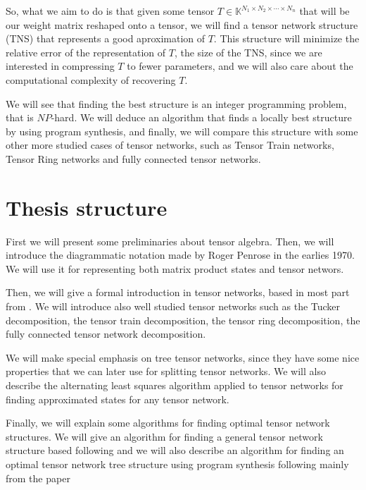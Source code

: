 \documentclass[11pt,a4paper,openright,oneside]{book}
\numberwithin{equation}{section}
\begin{document}
So, what we aim to do is that given some tensor $T \in \mathbb{K}^{N_1 \times N_2 \times \cdots \times N_n}$ that
will be our weight matrix reshaped onto a tensor, we will find a tensor network structure (TNS) that
represents a good aproximation of $T$. This structure will minimize the relative error of the representation of $T$,
the size of the TNS, since we are
interested in compressing $T$ to fewer parameters, and we will also care about the computational complexity of recovering
$T$.

We will see that finding the best structure is an integer programming problem, that is $NP$-hard. We will deduce
an algorithm that finds a locally best structure by using program synthesis, and finally, we will compare this 
structure with some other more studied cases of tensor networks, such as Tensor Train networks, Tensor Ring networks and
fully connected tensor networks.


\section{Thesis structure}


First we will present some preliminaries about tensor algebra. Then, we will introduce the
diagrammatic notation made by Roger Penrose in the earlies 1970. We will
use it for representing both matrix product states and tensor networs.

Then, we will give a formal introduction in tensor networks, based in most part from \cite{yeTensorNetworkRanks2019}.
We will introduce also well studied tensor networks such as the Tucker decomposition, the tensor train decomposition, the tensor ring decomposition,
the fully connected tensor network decomposition.

We will make special emphasis on tree tensor networks, since they have some nice properties that we can later use
for splitting tensor networks. We will also describe the alternating least squares algorithm applied to tensor networks
for finding approximated states for any tensor network.

Finally, we will explain some algorithms for finding optimal tensor network structures. We will give an algorithm for
finding a general tensor network structure based following \cite{liPermutationSearchTensor2022} and we will also describe an algorithm for finding an 
optimal tensor network tree structure using program synthesis following mainly from the paper \cite{guoTensorNetworkStructure2025}
\end{document}
